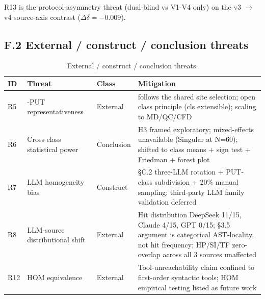 \documentclass[acmsmall,screen,review]{acmart}
\begin{document}
R13 is the protocol-asymmetry threat (dual-blind vs V1-V4 only) on the
v3 $\to$ v4 source-axis contrast ($\Delta\delta = -0.009$).

\subsection{F.2 External / construct / conclusion threats}\label{f.2-external-construct-conclusion-threats}

{\def\LTcaptype{table} %
\begin{longtable}[]{@{}
  >{\raggedright\arraybackslash}p{}
  >{\raggedright\arraybackslash}p{}
  >{\raggedright\arraybackslash}p{}
  >{\raggedright\arraybackslash}p{}@{}}
\caption{External / construct / conclusion threats.}\label{tab:p2-28}\\
\toprule\noalign{}
\begin{minipage}[b]{\linewidth}\raggedright
ID
\end{minipage} & \begin{minipage}[b]{\linewidth}\raggedright
Threat
\end{minipage} & \begin{minipage}[b]{\linewidth}\raggedright
Class
\end{minipage} & \begin{minipage}[b]{\linewidth}\raggedright
Mitigation
\end{minipage} \\
\midrule\noalign{}
\endfirsthead
\endhead
\bottomrule\noalign{}
\endlastfoot
R5 & 12-PUT representativeness & External & follows the shared site selection;
open class principle (cls extensible); scaling to MD/QC/CFD \\
R6 & Cross-class statistical power & Conclusion & H3 framed exploratory;
mixed-effects unavailable (Singular at N=60); shifted to class means +
sign test + Friedman + forest plot \\
R7 & LLM homogeneity bias & Construct & §C.2 three-LLM rotation +
PUT-class subdivision + 20\% manual sampling; third-party LLM family
validation deferred \\
R8 & LLM-source distributional shift & External & Hit distribution
DeepSeek 11/15, Claude 4/15, GPT 0/15; §3.5 argument is categorical
AST-locality, not hit frequency; HP/SI/TF zero-overlap across all 3
sources unaffected \\
R12 & HOM equivalence & External & Tool-unreachability claim confined to
first-order syntactic tools; HOM empirical testing listed as future
work \\
\end{longtable}
}
\end{document}
